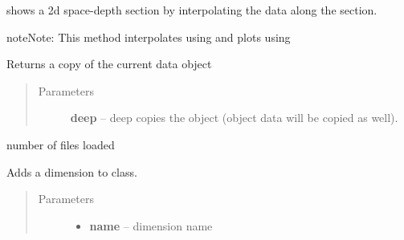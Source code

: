 \documentclass[letterpaper,10pt,english]{sphinxmanual}
\begin{document}
\begin{fulllineitems}
\begin{fulllineitems}
\end{fulllineitems}


\begin{fulllineitems}
\label{altimetry.data:altimetry.data.hydro_data.contour_transect}
shows a 2d space-depth section by interpolating the data along the section.

\begin{notice}{note}{Note:}
This method interpolates using  and plots using 
\end{notice}

\end{fulllineitems}


\begin{fulllineitems}
\label{altimetry.data:altimetry.data.hydro_data.copy}
Returns a copy of the current data object
\begin{quote}\begin{description}
\item[{Parameters}] \leavevmode
\textbf{deep} -- deep copies the object (object data will be copied as well).

\end{description}\end{quote}

\end{fulllineitems}


\begin{fulllineitems}
\label{altimetry.data:altimetry.data.hydro_data.count}
number of files loaded

\end{fulllineitems}


\begin{fulllineitems}
\label{altimetry.data:altimetry.data.hydro_data.create_Dim}
Adds a dimension to class.
\begin{quote}\begin{description}
\item[{Parameters}] \leavevmode\begin{itemize}
\item {} 
\textbf{name} -- dimension name


\end{itemize}
\end{description}
\end{quote}
\end{fulllineitems}
\end{fulllineitems}
\end{document}
